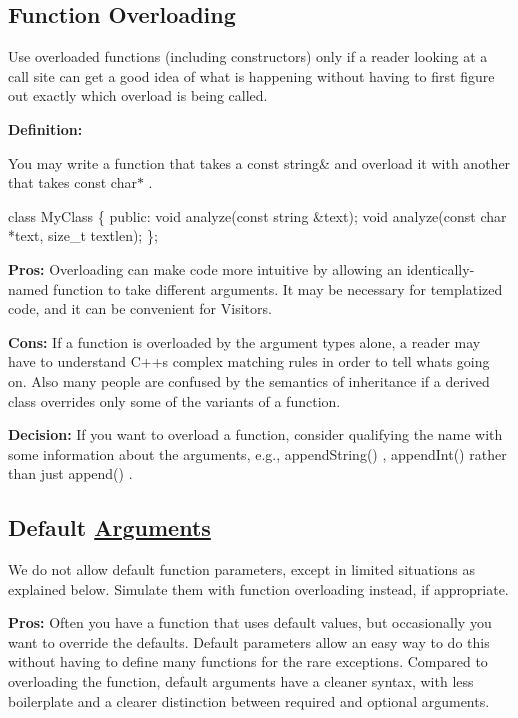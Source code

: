 \subsection*{Function Overloading}

Use overloaded functions (including constructors) only if a reader looking at a call site can get a good idea of what is happening without having to first figure out exactly which overload is being called.

{\bfseries Definition\+:}

You may write a function that takes a {\ttfamily const string\&} and overload it with another that takes {\ttfamily const char$\ast$} .


\begin{DoxyCode}
\textcolor{keyword}{class }MyClass
\{
\textcolor{keyword}{public}:
    \textcolor{keywordtype}{void} analyze(\textcolor{keyword}{const} \textcolor{keywordtype}{string} &text);
    \textcolor{keywordtype}{void} analyze(\textcolor{keyword}{const} \textcolor{keywordtype}{char} *text, \textcolor{keywordtype}{size\_t} textlen);
\};
\end{DoxyCode}


{\bfseries Pros\+:} Overloading can make code more intuitive by allowing an identically-\/named function to take different arguments. It may be necessary for templatized code, and it can be convenient for Visitors.

{\bfseries Cons\+:} If a function is overloaded by the argument types alone, a reader may have to understand C++\textquotesingle{}s complex matching rules in order to tell what\textquotesingle{}s going on. Also many people are confused by the semantics of inheritance if a derived class overrides only some of the variants of a function.

{\bfseries Decision\+:} If you want to overload a function, consider qualifying the name with some information about the arguments, e.\+g., {\ttfamily append\+String()} , {\ttfamily append\+Int()} rather than just {\ttfamily append()} .

\subsection*{Default \hyperlink{classArguments}{Arguments}}

We do not allow default function parameters, except in limited situations as explained below. Simulate them with function overloading instead, if appropriate.

{\bfseries Pros\+:} Often you have a function that uses default values, but occasionally you want to override the defaults. Default parameters allow an easy way to do this without having to define many functions for the rare exceptions. Compared to overloading the function, default arguments have a cleaner syntax, with less boilerplate and a clearer distinction between \textquotesingle{}required\textquotesingle{} and \textquotesingle{}optional\textquotesingle{} arguments.

